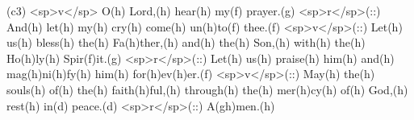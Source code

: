 (c3) <sp>v</sp> O(h) Lord,(h) hear(h) my(f) prayer.(g) <sp>r</sp>(::) And(h) let(h) my(h) cry(h) come(h) un(h)to(f) thee.(f) <sp>v</sp>(::) Let(h) us(h) bless(h) the(h) Fa(h)ther,(h) and(h) the(h) Son,(h) with(h) the(h) Ho(h)ly(h) Spir(f)it.(g) <sp>r</sp>(::) Let(h) us(h) praise(h) him(h) and(h) mag(h)ni(h)fy(h) him(h) for(h)ev(h)er.(f) <sp>v</sp>(::) May(h) the(h) souls(h) of(h) the(h) faith(h)ful,(h) through(h) the(h) mer(h)cy(h) of(h) God,(h) rest(h) in(d) peace.(d) <sp>r</sp>(::) A(gh)men.(h)